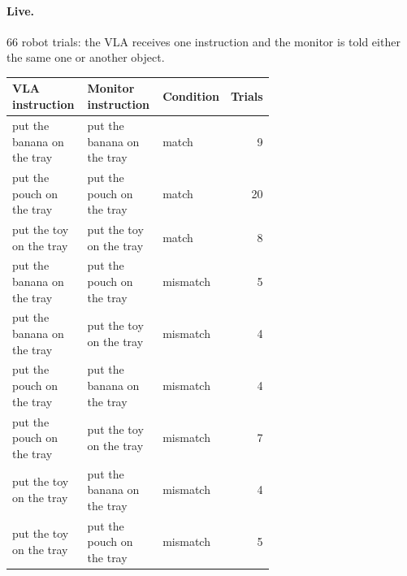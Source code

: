 \paragraph{Live.} 66 robot trials: the VLA receives one instruction and the
monitor is told either the same one or another object.
{\small
\begin{longtable}{p{0.32\linewidth} p{0.32\linewidth} l r}
\toprule
VLA instruction & Monitor instruction & Condition & Trials \\
\midrule
\endhead
put the banana on the tray & put the banana on the tray & match & 9 \\
put the pouch on the tray & put the pouch on the tray & match & 20 \\
put the toy on the tray & put the toy on the tray & match & 8 \\
put the banana on the tray & put the pouch on the tray & mismatch & 5 \\
put the banana on the tray & put the toy on the tray & mismatch & 4 \\
put the pouch on the tray & put the banana on the tray & mismatch & 4 \\
put the pouch on the tray & put the toy on the tray & mismatch & 7 \\
put the toy on the tray & put the banana on the tray & mismatch & 4 \\
put the toy on the tray & put the pouch on the tray & mismatch & 5 \\
\bottomrule
\end{longtable}}
